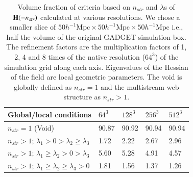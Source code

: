 \begin{table}
\centering
  \caption{Volume fraction of criteria based on $n_{str}$ and $\lambda$s of ${\bf H}(-n_{str})$ calculated at various resolutions. We chose a smaller slice of $ 50 h^{-1} \text{Mpc} \times 50 h^{-1} \text{Mpc} \times 50 h^{-1} \text{Mpc} $ i.e., half the volume of the original GADGET simulation box. The refinement factors are the multiplication factors of 1, 2, 4 and 8 times of the native resolution ($64^3$) of the simulation grid along each axis. Eigenvalues of the Hessian of the field are local geometric parameters. The void is globally defined as $n_{str} = 1$ and the multistream web structure as $n_{str} > 1$.}


\begin{tabular}{|l|l|l|l|l|}
\hline
Global/local conditions & $64^3$   & $128^3$   & $256^3$  & $512^3$  \\  \hline
$n_{str} = 1$ (Void)     &    90.87   & 90.92  & 90.94 & 90.94 \\ \hline
$n_{str} > 1$; $\lambda_1 > 0 > \lambda_2 \geq \lambda_3 $  &  1.72 & 2.22 & 2.67 & 2.96    \\ \hline
$n_{str} > 1$; $\lambda_1 \geq \lambda_2 > 0 > \lambda_3 $ & 5.60 & 5.28 & 4.91 & 4.57   \\ \hline
$n_{str} > 1$; $\lambda_1 \geq \lambda_2 \geq \lambda_3 > 0$ & 1.81 & 1.56 & 1.37 & 1.26 \\ \hline

\end{tabular}
\label{tab:VolfrRefLambda}
\end{table}

